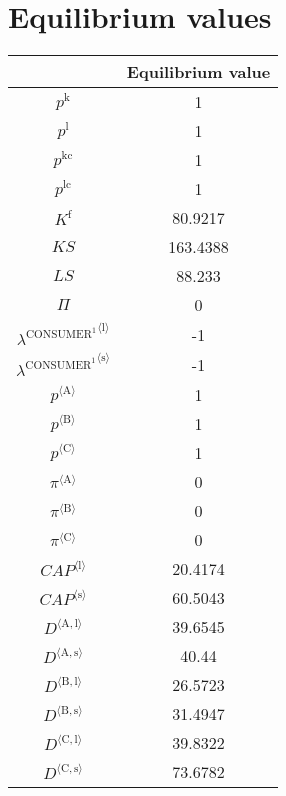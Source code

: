 

\section{Equilibrium values}


\begin{tabular}{c|c|}
  & Equilibrium value\\
\hline
$p^{\mathrm{k}}$ & 1 \\
$p^{\mathrm{l}}$ & 1 \\
$p^{\mathrm{kc}}$ & 1 \\
$p^{\mathrm{lc}}$ & 1 \\
$K^{\mathrm{f}}$ & 80.9217 \\
${K\!S}$ & 163.4388 \\
${L\!S}$ & 88.233 \\
$\Pi$ & 0 \\
${\lambda^{\mathrm{CONSUMER}^{\mathrm{1}}}}^{\langle \mathrm{l}\rangle}$ & -1 \\
${\lambda^{\mathrm{CONSUMER}^{\mathrm{1}}}}^{\langle \mathrm{s}\rangle}$ & -1 \\
${p}^{\langle \mathrm{A}\rangle}$ & 1 \\
${p}^{\langle \mathrm{B}\rangle}$ & 1 \\
${p}^{\langle \mathrm{C}\rangle}$ & 1 \\
${\pi}^{\langle \mathrm{A}\rangle}$ & 0 \\
${\pi}^{\langle \mathrm{B}\rangle}$ & 0 \\
${\pi}^{\langle \mathrm{C}\rangle}$ & 0 \\
${{C\!A\!P}}^{\langle \mathrm{l}\rangle}$ & 20.4174 \\
${{C\!A\!P}}^{\langle \mathrm{s}\rangle}$ & 60.5043 \\
${D}^{\langle \mathrm{A},\mathrm{l}\rangle}$ & 39.6545 \\
${D}^{\langle \mathrm{A},\mathrm{s}\rangle}$ & 40.44 \\
${D}^{\langle \mathrm{B},\mathrm{l}\rangle}$ & 26.5723 \\
${D}^{\langle \mathrm{B},\mathrm{s}\rangle}$ & 31.4947 \\
${D}^{\langle \mathrm{C},\mathrm{l}\rangle}$ & 39.8322 \\
${D}^{\langle \mathrm{C},\mathrm{s}\rangle}$ & 73.6782 \\

\end{tabular}
